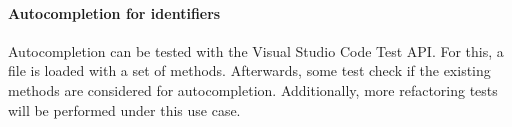 \paragraph{Autocompletion for identifiers}
Autocompletion can be tested with the Visual Studio Code Test API. For this, a file is loaded with a set of methods. Afterwards, some test check if the existing methods are considered for autocompletion. Additionally, more refactoring tests will be performed under this use case. 
